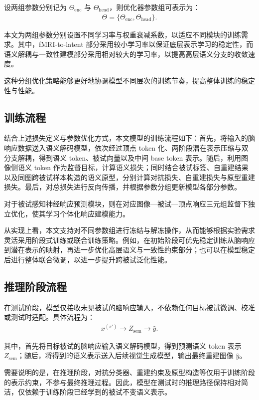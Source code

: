 设两组参数分别记为 $\Theta_{\mathrm{enc}}$ 与 $\Theta_{\mathrm{head}}$，则优化器参数组可表示为：
\begin{align}
  \Theta = \{\Theta_{\mathrm{enc}}, \Theta_{\mathrm{head}}\}.
\end{align}

本文为两组参数分别设置不同学习率与权重衰减系数，以适应不同模块的训练需求。其中，fMRI-to-latent 部分采用较小学习率以保证底层表示学习的稳定性，而语义解耦与一致性建模部分采用相对较大的学习率，以提高高层语义分支的收敛速度。

这种分组优化策略能够更好地协调模型不同层次的训练节奏，提高整体训练的稳定性与性能。

\subsection{训练流程}

结合上述损失定义与参数优化方式，本文模型的训练流程如下：首先，将输入的脑响应数据送入语义解码模型，依次经过顶点 token 化、两阶段潜在表示压缩与双分支解耦，得到语义 token、被试向量以及中间 base token 表示。随后，利用图像侧语义 token 作为监督目标，计算语义损失；同时结合被试标签、自重建结果以及同图跨被试样本构造的语义原型，分别计算对抗损失、自重建损失与原型重建损失。最后，对总损失进行反向传播，并根据参数分组更新模型各部分参数。

对于被试感知神经响应预测模块，则在对应图像—被试—顶点响应三元组监督下独立优化，使其学习个体化响应建模能力。

从实现上看，本文支持对不同参数组进行冻结与解冻操作，从而能够根据实验需求灵活采用阶段式训练或联合训练策略。例如，在初始阶段可优先稳定训练从脑响应到潜在表示的映射，再进一步优化高层语义与一致性约束部分；也可以在模型稳定后进行整体联合微调，以进一步提升跨被试泛化性能。

\subsection{推理阶段流程}

在测试阶段，模型仅接收未见被试的脑响应输入，不依赖任何目标被试微调、校准或测试时适配。具体流程为：
\begin{align}
  x^{(s')} \rightarrow Z_{\mathrm{sem}} \rightarrow \hat{y}.
\end{align}

其中，首先将目标被试的脑响应输入语义解码模型，得到预测语义 token 表示 $Z_{\mathrm{sem}}$；随后，将得到的语义表示送入后续视觉生成模型，输出最终重建图像 $\hat{y}$。

需要说明的是，在推理阶段，对抗分类器、重建约束及原型构造等仅用于训练阶段的表示约束，不参与最终推理过程。因此，模型在测试时的推理路径保持相对简洁，仅依赖于训练阶段已经学到的被试不变语义表示。

\chapterbib
